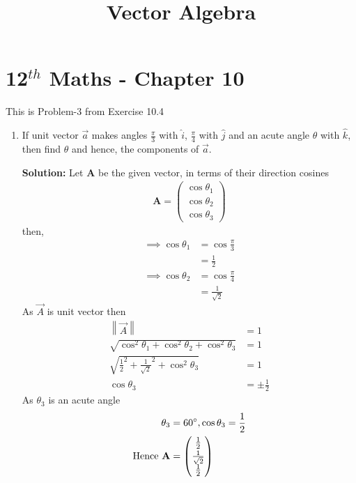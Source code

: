 \documentclass[12pt]{article}
\providecommand{\norm}[1]{\left\lVert#1\right\rVert}
\newcommand{\solution}{\noindent \textbf{Solution: }}
\newcommand{\myvec}[1]{\ensuremath{\begin{pmatrix}#1\end{pmatrix}}}
\let\vec\mathbf
\begin{document}
\begin{center}
\enlargethispage{-4cm}
\title{\textbf{Vector Algebra}}
\date{\vspace{-5ex}} %
\maketitle
\end{center}
\setcounter{page}{1}
\section*{12$^{th}$ Maths - Chapter 10}
This is Problem-3 from Exercise 10.4
\begin{enumerate}
\item If unit vector $\overrightarrow{a}$ makes angles $\frac{\pi}{3}$ with $\hat{i}$, $\frac{\pi}{4}$ with $\hat{j}$ and an acute angle $\theta$ with $\hat{k}$, then find $\theta$ and hence, the components of $\overrightarrow{a}$.

\solution
		Let $\vec{A}$ be the given vector, in terms of their direction cosines 
		\begin{align}
			\vec{A}=\myvec{\cos\theta_1\\\cos\theta_2\\\cos\theta_3}
		\end{align}
then,
		\begin{align}
			\implies\cos\theta_1 &=\cos\frac{\pi}{3}\\
			&=\frac{1}{2}\\
			\implies\cos\theta_2 &=\cos\frac{\pi}{4}\\
			&=\frac{1}{\sqrt{2}}
		\end{align}
As $\Vec{A}$ is unit vector then
\begin{align}
    \norm{\Vec{A}}&=1\\
    \sqrt{\cos^2\theta_1+\cos^2\theta_2+\cos^2\theta_3}&=1\\
    \sqrt{\frac{1}{2}^2+\frac{1}{\sqrt{2}}^2+\cos^2\theta_3 }&=1\\
    \cos\theta_3 &=\pm\frac{1}{2}
\end{align}
As $\theta_3$ is an acute angle
\begin{align}
    \theta_3&=60\degree, \cos\theta_3=\frac{1}{2}\\
    \text{Hence }\vec{A}&=\myvec{\frac{1}{2}\\[2pt] \frac{1}{\sqrt{2}}\\[2pt] \frac{1}{2}}
\end{align}
\end{enumerate}
\end{document}
